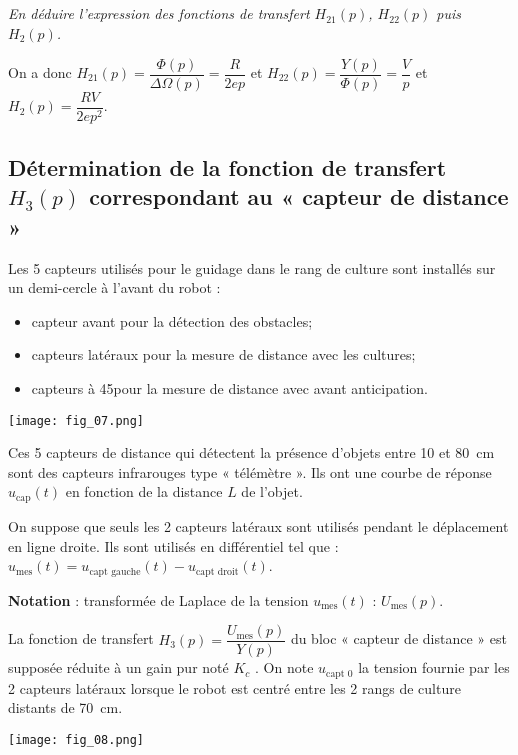 \begin{multicols}{2}
\subparagraph{}
\textit{ En déduire l’expression des  fonctions de transfert $H_{21} (p)$, $H_{22} (p)$ puis $H_2 (p)$.  }
\ifprof
\begin{corrige}
On a donc $H_{21}(p)=\dfrac{\Phi(p)}{\Delta \Omega(p)} = \dfrac{R}{2ep}$ et $H_{22}(p)=\dfrac{Y(p)}{\Phi(p)}=\dfrac{V}{p}$ et $H_2(p)=\dfrac{RV}{2ep^2}$.

\end{corrige}
\else
\fi

 \subsection*{Détermination de la fonction de transfert $H_3 (p)$ correspondant au « capteur de distance » }
\ifprof
\else
Les 5 capteurs utilisés pour le guidage dans le  rang de culture sont installés sur un demi-cercle à l’avant du robot : 
\begin{itemize}
\item capteur avant pour la détection des obstacles;
\item capteurs latéraux pour la mesure de distance avec les cultures;
\item capteurs à 45\degres pour la mesure de distance avec avant  anticipation. 
\end{itemize}

\begin{center}
\texttt{[image: fig\_07.png]}
\end{center}

Ces 5 capteurs de distance qui détectent la présence d’objets entre 10 et \SI{80}{cm} sont des capteurs infrarouges type « télémètre ». Ils ont une courbe de réponse $u_{\text{cap}} (t)$ en fonction de la  distance $L$ de l’objet. 

On suppose que seuls les 2 capteurs latéraux sont utilisés pendant le déplacement en ligne droite. Ils sont utilisés en différentiel tel que :  $u_{\text{mes}}(t) = u_{\text{capt gauche}}(t) - u_{\text{capt droit}}(t)$.  

\textbf{Notation} : transformée de Laplace de la tension $u_{\text{mes}} (t)$ : $U_{\text{mes}} (p)$. 

La fonction de transfert $H_3(p) = \dfrac{U_{\text{mes}}(p)}{Y(p)}$ du bloc « capteur de distance » est supposée réduite à un gain pur noté $K_c$ . On note $u_{\text{capt 0}}$ la tension fournie par les 2 capteurs latéraux lorsque le robot est centré entre les 2 rangs de culture distants de \SI{70}{cm}. 

\begin{center}
\texttt{[image: fig\_08.png]}
\end{center}


\end{multicols}
